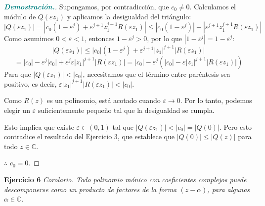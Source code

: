 \documentclass[12pt, letterpaper]{article}
\begin{document}
\begin{proof}[\textbf{\textcolor{teal}{Demostración.}}]
    Supongamos, por contradicción, que $c_0 \neq 0$.
    Calculamos el módulo de $Q(\varepsilon z_1)$ y aplicamos la desigualdad del triángulo:
    \[ |Q(\varepsilon z_1)| = |c_0 (1 - \varepsilon^j) + \varepsilon^{j+1} z_1^{j+1} R(\varepsilon z_1)| \leq |c_0 (1 - \varepsilon^j)| + |\varepsilon^{j+1} z_1^{j+1} R(\varepsilon z_1)| \]
    Como asumimos $0 < \varepsilon < 1$, entonces $1 - \varepsilon^j > 0$, por lo que $|1 - \varepsilon^j| = 1 - \varepsilon^j$:
    \[ |Q(\varepsilon z_1)| \leq |c_0| (1 - \varepsilon^j) + \varepsilon^{j+1} |z_1|^{j+1} |R(\varepsilon z_1)| \]
    \[ = |c_0| - \varepsilon^j |c_0| + \varepsilon^j \varepsilon |z_1|^{j+1} |R(\varepsilon z_1)| = |c_0| - \varepsilon^j \left( |c_0| - \varepsilon |z_1|^{j+1} |R(\varepsilon z_1)| \right) \]
    Para que $|Q(\varepsilon z_1)| < |c_0|$, necesitamos que el término entre paréntesis sea positivo, es decir, $\varepsilon |z_1|^{j+1} |R(\varepsilon z_1)| < |c_0|$.
    
    Como $R(z)$ es un polinomio, está acotado cuando $\varepsilon \to 0$. Por lo tanto, podemos elegir un $\varepsilon$ suficientemente pequeño tal que la desigualdad se cumpla.
    
    Esto implica que existe $\varepsilon \in (0, 1)$ tal que $|Q(\varepsilon z_1)| < |c_0| = |Q(0)|$.
    Pero esto contradice el resultado del Ejercicio 3, que establece que $|Q(0)| \leq |Q(z)|$ para todo $z \in \mathbb{C}$.
    
     $\therefore$ $c_0 = 0$.
\end{proof}

\vspace{0.4cm}
\noindent \textbf{Ejercicio 6} \textit{Corolario. Todo polinomio mónico con coeficientes complejos puede descomponerse como un producto de factores de la forma $(z - \alpha)$, para algunas $\alpha \in \mathbb{C}$.}
\end{document}
